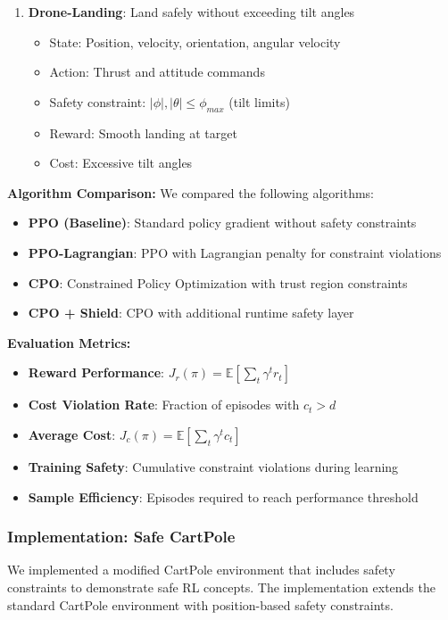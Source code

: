 \documentclass[12pt]{article}
\begin{document}
{{{{\begin{enumerate}
\item \textbf{Drone-Landing}: Land safely without exceeding tilt angles
\begin{itemize}
\item State: Position, velocity, orientation, angular velocity
\item Action: Thrust and attitude commands
\item Safety constraint: $|\phi|, |\theta| \leq \phi_{max}$ (tilt limits)
\item Reward: Smooth landing at target
\item Cost: Excessive tilt angles
\end{itemize}
\end{enumerate}

\textbf{Algorithm Comparison:}
We compared the following algorithms:
\begin{itemize}
\item \textbf{PPO (Baseline)}: Standard policy gradient without safety constraints
\item \textbf{PPO-Lagrangian}: PPO with Lagrangian penalty for constraint violations
\item \textbf{CPO}: Constrained Policy Optimization with trust region constraints
\item \textbf{CPO + Shield}: CPO with additional runtime safety layer
\end{itemize}

\textbf{Evaluation Metrics:}
\begin{itemize}
\item \textbf{Reward Performance}: $J_r(\pi) = \mathbb{E}[\sum_t \gamma^t r_t]$
\item \textbf{Cost Violation Rate}: Fraction of episodes with $c_t > d$
\item \textbf{Average Cost}: $J_c(\pi) = \mathbb{E}[\sum_t \gamma^t c_t]$
\item \textbf{Training Safety}: Cumulative constraint violations during learning
\item \textbf{Sample Efficiency}: Episodes required to reach performance threshold
\end{itemize}

\subsubsection{Implementation: Safe CartPole}

We implemented a modified CartPole environment that includes safety constraints to demonstrate safe RL concepts. The implementation extends the standard CartPole environment with position-based safety constraints.

}}}}
\end{document}

